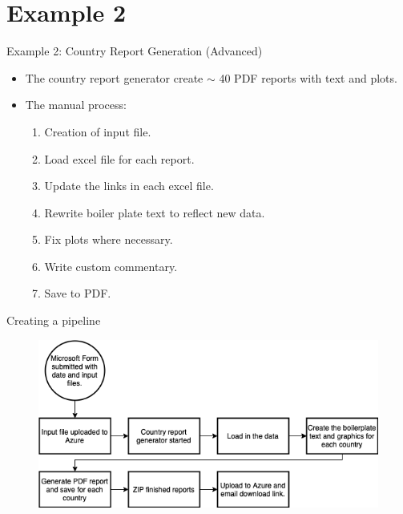 \documentclass[aspectratio=169]{beamer}
\begin{document}
\section{Example 2}

\begin{frame}{Example 2: Country Report Generation (Advanced)}

\begin{itemize}
	\item The country report generator create $\sim$ 40 PDF reports with text and plots. 
	\item The manual process:
	\begin{enumerate}
		\item Creation of input file.
		\item Load excel file for each report.
		\item Update the links in each excel file.
		\item Rewrite boiler plate text to reflect new data.
		\item Fix plots where necessary.
		\item Write custom commentary.
		\item Save to PDF.
	\end{enumerate}
\end{itemize}

\end{frame}

\begin{frame}{Creating a pipeline}
\begin{figure}
\centering
\includegraphics[width=0.7\linewidth]{graphics/CountryReportGenerator.drawio.png}	
\end{figure}

\end{frame}
\end{document}

